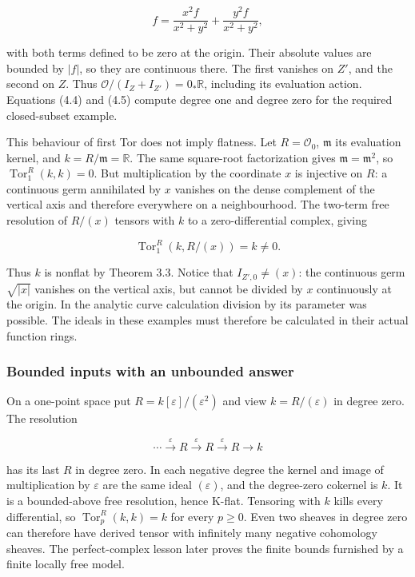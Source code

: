 \documentclass[
  english,
  11pt,
  a4paper,
]{article}
\begin{document}
\[f=\frac{x^2f}{x^2+y^2}+\frac{y^2f}{x^2+y^2},
\tag{4.5}\]

with both terms defined to be zero at the origin. Their absolute values
are bounded by \(|f|\), so they are continuous there. The first vanishes
on \(Z'\), and the second on \(Z\). Thus
\(\mathcal O/(I_Z+I_{Z'})=0_*\mathbb R\), including its evaluation
action. Equations (4.4) and (4.5) compute degree one and degree zero for
the required closed-subset example.

This behaviour of first Tor does not imply flatness. Let
\(R=\mathcal O_0\), \(\mathfrak m\) its evaluation kernel, and
\(k=R/\mathfrak m=\mathbb R\). The same square-root factorization gives
\(\mathfrak m=\mathfrak m^2\), so \(\operatorname{Tor}_1^R(k,k)=0\). But
multiplication by the coordinate \(x\) is injective on \(R\): a
continuous germ annihilated by \(x\) vanishes on the dense complement of
the vertical axis and therefore everywhere on a neighbourhood. The
two-term free resolution of \(R/(x)\) tensors with \(k\) to a
zero-differential complex, giving

\[\operatorname{Tor}_1^R(k,R/(x))=k\ne0.
\tag{4.6}\]

Thus \(k\) is nonflat by Theorem 3.3. Notice that \(I_{Z',0}\ne(x)\):
the continuous germ \(\sqrt{|x|}\) vanishes on the vertical axis, but
cannot be divided by \(x\) continuously at the origin. In the analytic
curve calculation division by its parameter was possible. The ideals in
these examples must therefore be calculated in their actual function
rings.

\subsubsection{Bounded inputs with an unbounded
answer}\label{derived-tensor-products-and-tor-sheaves--bounded-inputs-with-an-unbounded-answer}

On a one-point space put \(R=k[\varepsilon]/(\varepsilon^2)\) and view
\(k=R/(\varepsilon)\) in degree zero. The resolution

\[\cdots\xrightarrow{\varepsilon}R
\xrightarrow{\varepsilon}R
\xrightarrow{\varepsilon}R\longrightarrow k
\tag{4.7}\]

has its last \(R\) in degree zero. In each negative degree the kernel
and image of multiplication by \(\varepsilon\) are the same ideal
\((\varepsilon)\), and the degree-zero cokernel is \(k\). It is a
bounded-above free resolution, hence K-flat. Tensoring with \(k\) kills
every differential, so \(\operatorname{Tor}_p^R(k,k)=k\) for every
\(p\ge0\). Even two sheaves in degree zero can therefore have derived
tensor with infinitely many negative cohomology sheaves. The
perfect-complex lesson later proves the finite bounds furnished by a
finite locally free model.
\end{document}
